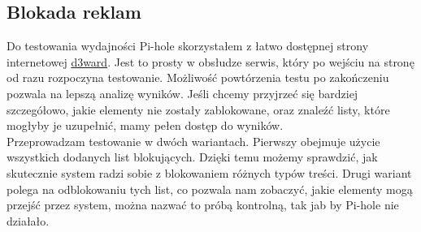 \documentclass{article}
\begin{document}
\subsection*{Blokada reklam}
Do testowania wydajności Pi-hole skorzystałem z łatwo dostępnej strony internetowej \href{https://d3ward.github.io/toolz/adblock.html}{d3ward}. Jest to prosty w obsłudze serwis, który po wejściu na stronę od razu rozpoczyna testowanie. Możliwość powtórzenia testu po zakończeniu pozwala na lepszą analizę wyników. Jeśli chcemy przyjrzeć się bardziej szczegółowo, jakie elementy nie zostały zablokowane, oraz znaleźć listy, które mogłyby je uzupełnić, mamy pełen dostęp do wyników.\\

Przeprowadzam testowanie w dwóch wariantach. Pierwszy obejmuje użycie wszystkich dodanych list blokujących. Dzięki temu możemy sprawdzić, jak skutecznie system radzi sobie z blokowaniem różnych typów treści. Drugi wariant polega na odblokowaniu tych list, co pozwala nam zobaczyć, jakie elementy mogą przejść przez system, można nazwać to próbą kontrolną, tak jab by Pi-hole nie działało.\cite{piholeBLog}
\end{document}
